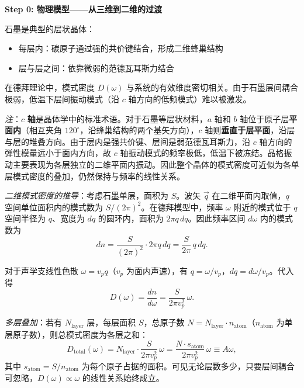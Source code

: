 \begin{derivationbox}[标准解题过程]
\textbf{Step 0: 物理模型——从三维到二维的过渡}

石墨是典型的层状晶体：
\begin{itemize}
    \item 每层内：碳原子通过强的共价键结合，形成二维蜂巢结构
    \item 层与层之间：依靠微弱的范德瓦耳斯力结合
\end{itemize}

在德拜理论中，模式密度 $D(\omega)$ 与系统的有效维度密切相关。由于石墨层间耦合极弱，低温下层间振动模式（沿 $c$ 轴方向的低频模式）难以被激发。

\textit{注}：$c$ \textbf{轴}是晶体学中的标准术语。对于石墨等层状材料，$a$ 轴和 $b$ 轴位于原子层\textbf{平面内}（相互夹角 $120^\circ$，沿蜂巢结构的两个基矢方向），$c$ 轴则\textbf{垂直于层平面}，沿层与层的堆叠方向。由于层内是强共价键、层间是弱范德瓦耳斯力，沿 $c$ 轴方向的弹性模量远小于面内方向，故 $c$ 轴振动模式的频率极低，低温下被冻结。晶格振动主要表现为各层独立的二维平面内振动。因此整个晶体的模式密度可近似为各单层模式密度的叠加，仍然保持与频率的线性关系。

\textit{二维模式密度的推导}：考虑石墨单层，面积为 $S$。波矢 $\vec q$ 在二维平面内取值，$q$ 空间单位面积内的模式数为 $S/(2\pi)^2$。在德拜模型中，频率 $\omega$ 附近的模式位于 $q$ 空间半径为 $q$、宽度为 $dq$ 的圆环内，面积为 $2\pi q\,dq$。因此频率区间 $d\omega$ 内的模式数为
\begin{equation}
dn=\frac{S}{(2\pi)^2}\cdot2\pi q\,dq=\frac{S}{2\pi}\,q\,dq.
\end{equation}

对于声学支线性色散 $\omega=v_pq$（$v_p$ 为面内声速），有 $q=\omega/v_p$，$dq=d\omega/v_p$。代入得
\begin{equation}
D(\omega)=\frac{dn}{d\omega}=\frac{S}{2\pi v_p^2}\,\omega.
\end{equation}

\textit{多层叠加}：若有 $N_{\text{layer}}$ 层，每层面积 $S$，总原子数 $N=N_{\text{layer}}\cdot n_{\text{atom}}$（$n_{\text{atom}}$ 为单层原子数），则总模式密度为各层之和：
\begin{equation}
D_{\text{total}}(\omega)=N_{\text{layer}}\cdot\frac{S}{2\pi v_p^2}\,\omega
=\frac{N\cdot s_{\text{atom}}}{2\pi v_p^2}\,\omega\equiv A\omega,
\label{eq:2d-Domega}
\end{equation}
其中 $s_{\text{atom}}=S/n_{\text{atom}}$ 为每个原子占据的面积。可见无论层数多少，只要层间耦合可忽略，$D(\omega)\propto\omega$ 的线性关系始终成立。


\end{derivationbox}
